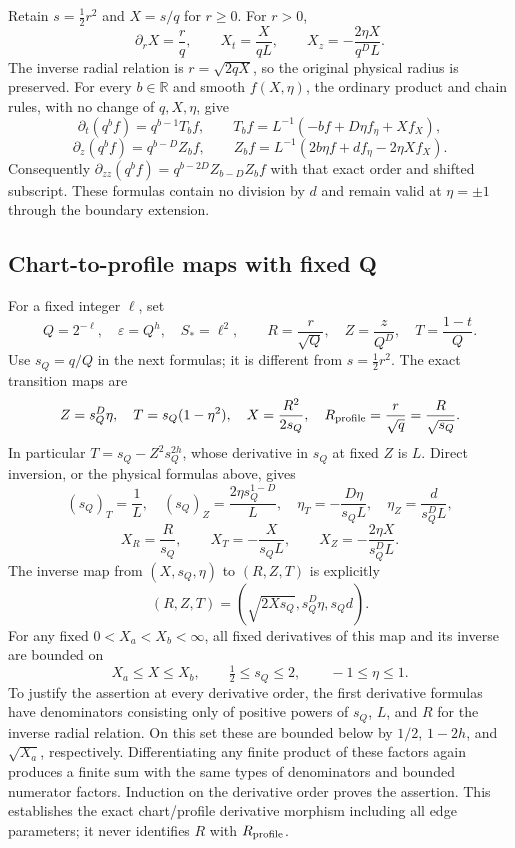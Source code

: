 \documentclass[10pt,a4paper]{article}
\begin{document}
Retain $s=\tfrac12r^2$ and $X=s/q$ for $r\ge0$.  For $r>0$,
\[
 \partial_rX=\frac rq,\qquad
 X_t=\frac X{qL},\qquad X_z=-\frac{2\eta X}{q^DL}.
\]
The inverse radial relation is $r=\sqrt{2qX}$, so the original physical
radius is preserved.  For every $b\in\mathbb R$ and smooth $f(X,\eta)$,
the ordinary product and chain rules, with no change of $q,X,\eta$, give
\[
 \partial_t(q^bf)=q^{b-1}T_bf,\qquad
 T_bf=L^{-1}(-bf+D\eta f_\eta+Xf_X),
\]
\[
 \partial_z(q^bf)=q^{b-D}Z_bf,\qquad
 Z_bf=L^{-1}(2b\eta f+df_\eta-2\eta Xf_X).
\]
Consequently $\partial_{zz}(q^bf)=q^{b-2D}Z_{b-D}Z_bf$ with that exact
order and shifted subscript.  These formulas contain no division by
$d$ and remain valid at $\eta=\pm1$ through the boundary extension.

\subsection{Chart-to-profile maps with fixed Q}
For a fixed integer $\ell$, set
\[
 Q=2^{-\ell},\quad\varepsilon=Q^h,\quad S_*=\ell^2,
 \qquad R=\frac r{\sqrt Q},\quad Z=\frac z{Q^D},\quad
 T=\frac{1-t}Q.
\]
Use $s_Q=q/Q$ in the next formulas; it is different from
$s=\tfrac12r^2$.  The exact transition maps are
\[
 Z=s_Q^D\eta,\quad T=s_Q(1-\eta^2),\quad
 X=\frac{R^2}{2s_Q},\quad
 R_{\rm profile}=\frac r{\sqrt q}=\frac R{\sqrt{s_Q}}.
\]
In particular $T=s_Q-Z^2s_Q^{2h}$, whose derivative in $s_Q$ at fixed
$Z$ is $L$.  Direct inversion, or the physical formulas above, gives
\[
 (s_Q)_T=\frac1L,\quad(s_Q)_Z=\frac{2\eta s_Q^{1-D}}L,
 \quad\eta_T=-\frac{D\eta}{s_QL},\quad
 \eta_Z=\frac{d}{s_Q^DL},
\]
\[
 X_R=\frac R{s_Q},\qquad X_T=-\frac X{s_QL},\qquad
 X_Z=-\frac{2\eta X}{s_Q^DL}.
\]
The inverse map from $(X,s_Q,\eta)$ to $(R,Z,T)$ is explicitly
\[
 (R,Z,T)=(\sqrt{2Xs_Q},s_Q^D\eta,s_Qd).
\]
For any fixed $0<X_a<X_b<\infty$, all fixed derivatives of this map
and its inverse are bounded on
\[
 X_a\le X\le X_b,\qquad \tfrac12\le s_Q\le2,
 \qquad -1\le\eta\le1.
\]
To justify the assertion at every derivative order, the first derivative
formulas have denominators consisting only of positive powers of $s_Q$,
$L$, and $R$ for the inverse radial relation.  On this set these are
bounded below by $1/2$, $1-2h$, and $\sqrt{X_a}$, respectively.
Differentiating any finite product of these factors again produces a
finite sum with the same types of denominators and bounded numerator
factors.  Induction on the derivative order proves the assertion.  This
establishes the exact chart/profile derivative morphism including all
edge parameters; it never identifies $R$ with $R_{\rm profile}$.
\end{document}
